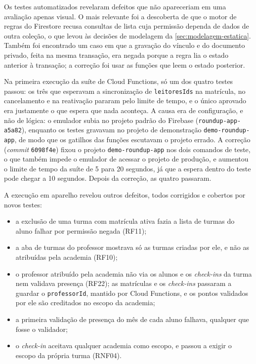 Os testes automatizados revelaram defeitos que não apareceriam em uma
avaliação apenas visual. O mais relevante foi a descoberta de que o
motor de regras do Firestore recusa consultas de lista cuja permissão
dependa de dados de outra coleção, o que levou às decisões de modelagem
da \autoref{sec:modelagem-estatica}. Também foi encontrado um caso em que
a gravação do vínculo e do documento privado, feita na mesma transação,
era negada porque a regra lia o estado anterior à transação; a correção
foi usar as funções que leem o estado posterior.

Na primeira execução da suíte de Cloud Functions, só um dos quatro testes
passou: os três que esperavam a sincronização de \texttt{leitoresIds} na
matrícula, no cancelamento e na reativação pararam pelo limite de tempo,
e o único aprovado era justamente o que espera que nada aconteça. A causa
era de configuração, e não de lógica: o emulador subia no projeto
padrão do Firebase (\texttt{roundup-app-a5a82}), enquanto os testes
gravavam no projeto de demonstração \texttt{demo-roundup-app}, de modo
que os gatilhos das funções escutavam o projeto errado. A correção
(\textit{commit} \texttt{6098f4e}) fixou o projeto
\texttt{demo-roundup-app} nos dois comandos de teste, o que também impede
o emulador de acessar o projeto de produção, e aumentou o limite de tempo
da suíte de 5 para 20 segundos, já que a espera dentro do teste pode
chegar a 10 segundos. Depois da correção, as quatro passaram.

A execução em aparelho revelou outros defeitos, todos corrigidos e
cobertos por novos testes:

\begin{itemize}
  \item a exclusão de uma turma com matrícula ativa fazia a lista de
        turmas do aluno falhar por permissão negada (RF11);
  \item a aba de turmas do professor mostrava só as turmas criadas por
        ele, e não as atribuídas pela academia (RF10);
  \item o professor atribuído pela academia não via os alunos e os
        \textit{check-ins} da turma nem validava presença (RF22); as
        matrículas e os \textit{check-ins} passaram a guardar o
        \texttt{professorId}, mantido por Cloud Functions, e os pontos
        validados por ele são creditados no escopo da academia;
  \item a primeira validação de presença do mês de cada aluno falhava,
        qualquer que fosse o validador;
  \item o \textit{check-in} aceitava qualquer academia como escopo, e
        passou a exigir o escopo da própria turma (RNF04).
\end{itemize}
